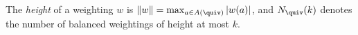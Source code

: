 \begin{definition}[Height]\label{sh-000B}
The \emph{height} of a weighting $w$ is $\|w\| = \max_{a \in A(\quiv)} |w(a)|$, and $N_{\quiv}(k)$ denotes the number of balanced weightings of height at most $k$.
\end{definition}
